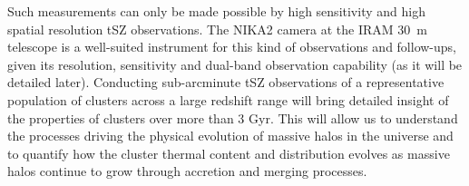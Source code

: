 \documentclass[11pt,a4paper,twoside,graphicx,color]{article}
\begin{document}
Such measurements can only be made possible by high sensitivity and high spatial resolution tSZ observations. 
The NIKA2 camera at the IRAM 30~m telescope is a well-suited instrument for this kind of observations and follow-ups, given its resolution, sensitivity and dual-band observation capability (as it will be detailed later). Conducting sub-arcminute tSZ observations of a representative population of clusters across a large redshift range will bring detailed insight of the properties of clusters over more than 3 Gyr. This will allow us to understand the processes driving the physical evolution of massive halos in the universe and to quantify 
how the cluster thermal content and distribution evolves as massive
halos continue to grow through accretion and merging processes. 

\end{document}
